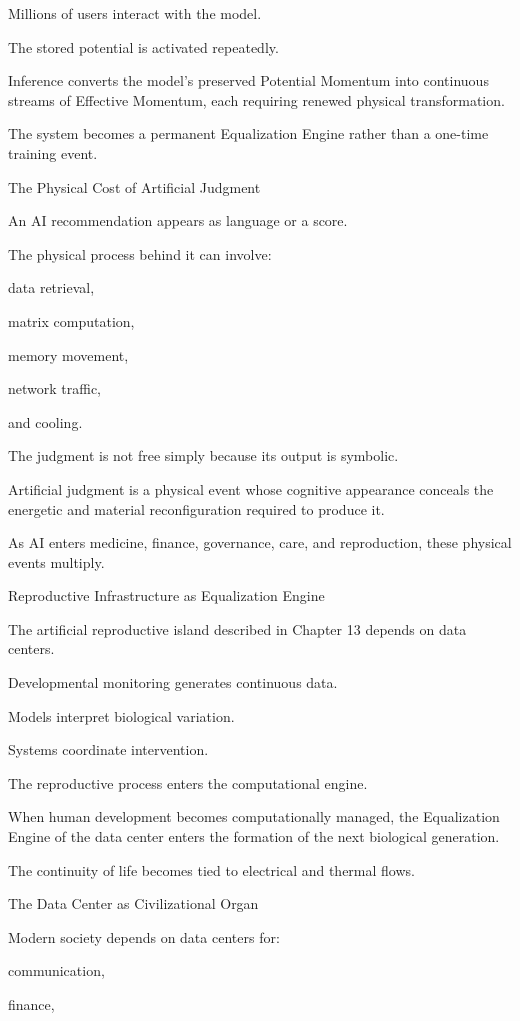 Millions of users interact with the model.

The stored potential is activated repeatedly.

Inference converts the model’s preserved Potential Momentum into continuous streams of Effective Momentum, each requiring renewed physical transformation.

The system becomes a permanent Equalization Engine rather than a one-time training event.

The Physical Cost of Artificial Judgment

An AI recommendation appears as language or a score.

The physical process behind it can involve:

data retrieval,

matrix computation,

memory movement,

network traffic,

and cooling.

The judgment is not free simply because its output is symbolic.

Artificial judgment is a physical event whose cognitive appearance conceals the energetic and material reconfiguration required to produce it.

As AI enters medicine, finance, governance, care, and reproduction, these physical events multiply.

Reproductive Infrastructure as Equalization Engine

The artificial reproductive island described in Chapter 13 depends on data centers.

Developmental monitoring generates continuous data.

Models interpret biological variation.

Systems coordinate intervention.

The reproductive process enters the computational engine.

When human development becomes computationally managed, the Equalization Engine of the data center enters the formation of the next biological generation.

The continuity of life becomes tied to electrical and thermal flows.

The Data Center as Civilizational Organ

Modern society depends on data centers for:

communication,

finance,

